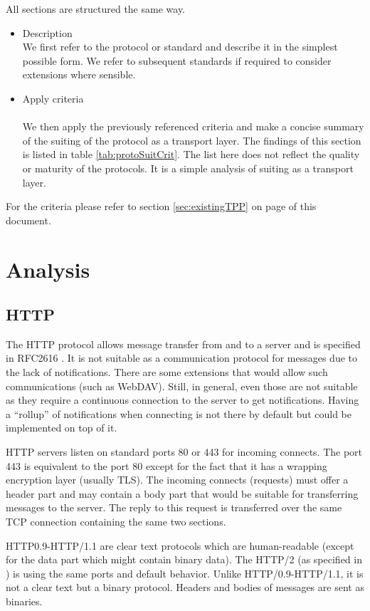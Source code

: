 \documentclass[a4paper,appendixprefix,pdfusetitle,twocolumn,fontsize=8pt,draft,DIV=calc,8pt]{\doctype} %
\begin{document}
All sections are structured the same way. 
\begin{itemize}
	\item Description\\
	We first refer to the protocol or standard and describe it in the simplest possible form. We refer to subsequent standards if required to consider extensions where sensible.
	\item Apply criteria\\\\
	We then apply the previously referenced criteria and make a concise summary of the suiting of the protocol as a transport layer. The findings of this section is listed in table \ref{tab:protoSuitCrit}. The list here does not reflect the quality or maturity of the protocols. It is a simple analysis of suiting as a transport layer.
\end{itemize} 

For the criteria please refer to section \ref{sec:existingTPP} on page \pageref{sec:existingTPP} of this document.

\section{Analysis}
\subsection{HTTP}
The HTTP protocol allows message transfer from and to a server and is specified in RFC2616 \cite{rfc2616}. It is not suitable as a communication protocol for messages due to the lack of notifications. There are some extensions that would allow such communications (such as WebDAV). Still, in general, even those are not suitable as they require a continuous connection to the server to get notifications. Having a ``rollup'' of notifications when connecting is not there by default but could be implemented on top of it. 

HTTP servers listen on standard ports 80 or 443 for incoming connects. The port 443 is equivalent to the port 80 except for the fact that it has a wrapping encryption layer (usually TLS). The incoming connects (requests) must offer a header part and may contain a body part that would be suitable for transferring messages to the server. The reply to this request is transferred over the same TCP connection containing the same two sections.

HTTP0.9-HTTP/1.1 are clear text protocols which are human-readable (except for the data part which might contain binary data). The HTTP/2 (as specified in \cite{rfc7540}) is using the same ports and default behavior. Unlike HTTP/0.9-HTTP/1.1, it is not a clear text but a binary protocol. Headers and bodies of messages are sent as binaries. 
\end{document}
